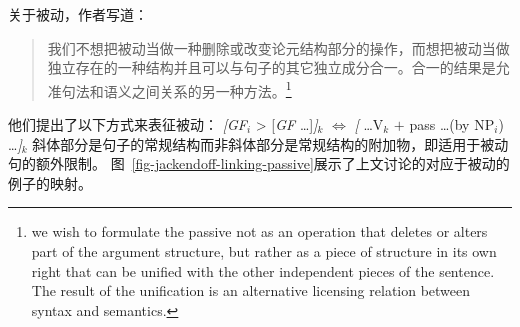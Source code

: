 \begin{exe}
\begin{xlist}[iv.]
\begin{exe}
\begin{xlist}[iv.]

关于被动，作者写道：

\begin{quote}
我们不想把被动当做一种删除或改变论元结构部分的操作，而想把被动当做独立存在的一种结构并且可以与句子的其它独立成分合一。合一的结果是允准句法和语义之间关系的另一种方法。\citep[]{CJ2005a}\footnote{%
we wish to formulate the passive not as an operation that deletes or alters part of the argument
structure, but rather as a piece of structure in its own right that can be unified with the other
independent pieces of the sentence. The result of the unification is an alternative licensing
relation between syntax and semantics.
}
\end{quote}
他们提出了以下方式来表征被动：
\ea
\label{constraint-CJ-passive}
{}\emph{[GF}$_i$ > [\emph{GF} \ldots]\emph{]}$_k$ $\Leftrightarrow$ \emph{[} \ldots V$_k$ $+$ pass \ldots (by NP$_i$) \ldots \emph{]}$_k$
\z
斜体部分是句子的常规结构而非斜体部分是常规结构的附加物，即适用于被动句的额外限制。
图~\ref{fig-jackendoff-linking-passive}展示了上文讨论的对应于被动的例子的映射。


\end{xlist}
\end{exe}
\end{xlist}
\end{exe}
